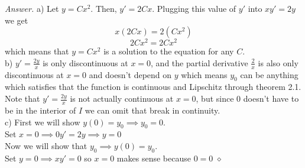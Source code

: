 \documentclass[12pt,oneside]{amsart}
\theoremstyle{definition}
\theoremstyle{remark}
\numberwithin{equation}{exer}
\newenvironment{answer}{\bigskip\noindent\emph{Answer.}}{\hfill$\diamond$\newline}
\begin{document}
\begin{answer}
a) Let $y=Cx^2$. Then, $y'=2Cx$. Plugging this value of $y'$ into $xy'=2y$ we get
$$x(2Cx)=2(Cx^2)$$
$$2Cx^2=2Cx^2$$
which means that $y=Cx^2$ is a solution to the equation for any $C$.\\
b) $y'=\frac{2y}{x}$ is only discontinuous at $x=0$, and the partial derivative $\frac{2}{x}$ is also only discontinuous at $x=0$ and doesn't depend on $y$ which means $y_0$ can be anything which satisfies that the function is continuous and Lipschitz through theorem 2.1.  \\
Note that $y'=\frac{2y}{x}$ is not actually continuous at $x=0$, but since 0 doesn't have to be in the interior of $I$ we can omit that break in continuity. \\
c) First we will show $y(0)=y_0\implies y_0=0$. \\ 
Set $x=0\implies 0y'=2y\implies y=0$ \\
Now we will show that $y_0\implies y(0)=y_0$. \\ 
Set $y=0\implies xy'=0$ so $x=0$ makes sense because $0=0$
\end{answer}
\end{document}
